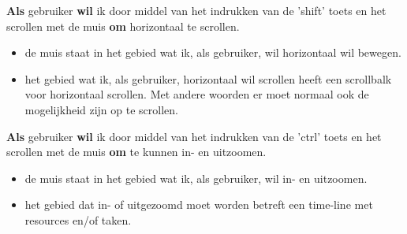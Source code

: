 \nextUserStory
\textbf{Als} gebruiker \textbf{wil} ik door middel van het indrukken van de 'shift' toets en het scrollen met de muis \textbf{om} horizontaal te scrollen. 
\begin{itemize} [label=\emph{ - Gegeven}, itemindent=2.5em, labelsep=0.3em]
    \item de muis staat in het gebied wat ik, als gebruiker, wil horizontaal wil bewegen.
    \item het gebied wat ik, als gebruiker, horizontaal wil scrollen heeft een scrollbalk voor horizontaal scrollen. Met andere woorden er moet normaal ook de mogelijkheid zijn op te scrollen.
\end{itemize}

\nextUserStory
\textbf{Als} gebruiker \textbf{wil} ik door middel van het indrukken van de 'ctrl' toets en het scrollen met de muis \textbf{om} te kunnen in- en uitzoomen. 
\begin{itemize} [label=\emph{ - Gegeven}, itemindent=2.5em, labelsep=0.3em]
    \item de muis staat in het gebied wat ik, als gebruiker, wil in- en uitzoomen. 
    \item het gebied dat in- of uitgezoomd moet worden betreft een time-line met resources en/of taken.
\end{itemize}

